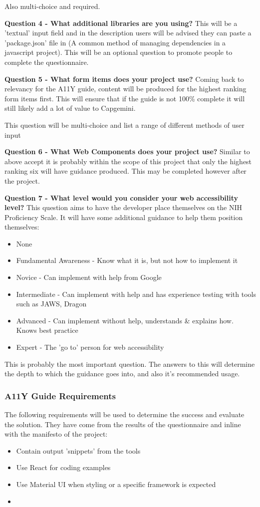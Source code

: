 Also multi-choice and required.

\textbf{Question 4 - What additional libraries are you using?}
This will be a 'textual' input field and in the description users will be
advised they can paste a 'package.json' file in (A common method of managing
dependencies in a javascript project). This will be an optional question to
promote people to complete the questionnaire.

\textbf{Question 5 - What form items does your project use?}
Coming back to relevancy for the A11Y guide, content will be produced for the
highest ranking form items first. This will ensure that if the guide is not
100\% complete it will still likely add a lot of value to Capgemini.

This question will be multi-choice and list a range of different methods of
user input

\textbf{Question 6 - What Web Components does your project use?}
Similar to above accept it is probably within the scope of this project that
only the highest ranking six will have guidance produced. This may be
completed however after the project.

\textbf{Question 7 - What level would you consider your web accessibility
level?}
This question aims to have the developer place themselves on the NIH
Proficiency Scale. It will have some additional guidance to help them
position themselves:
\begin{itemize}
\item None
\item Fundamental Awareness - Know what it is, but not how to implement it
\item Novice - Can implement with help from Google
\item Intermediate - Can implement with help and has experience testing with tools such as JAWS, Dragon
\item Advanced  - Can implement without help, understands \& explains how.
Knows best practice
\item Expert - The 'go to' person for web accessibility
\end{itemize}

This is probably the most important question. The answers to this will
determine the depth to which the guidance goes into, and also it's
recommended usage.

\subsubsection{A11Y Guide Requirements}
The following requirements will be used to determine the success and evaluate
the solution. They have come from the results of the questionnaire and inline
with the manifesto of the project:
\begin{itemize}
\item Contain output 'snippets' from the tools
\item Use React for coding examples
\item Use Material UI when styling or a specific framework is expected
\item
\end{itemize}

